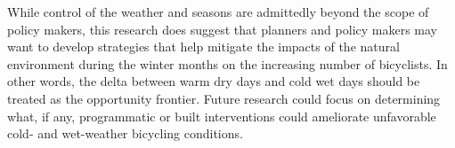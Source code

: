 \documentclass[12pt,letterpaper,article,twocolumn]{memoir}
\begin{document}
While control of the weather and seasons are admittedly beyond the
scope of policy makers, this research does suggest that planners and
policy makers may want to develop strategies that help mitigate the
impacts of the natural environment during the winter months on the
increasing number of bicyclists. In other words, the delta between
warm dry days and cold wet days should be treated as the opportunity
frontier. Future research could focus on determining what, if any,
programmatic or built interventions could ameliorate unfavorable cold-
and wet-weather bicycling conditions.

\printbibliography
\end{document}
